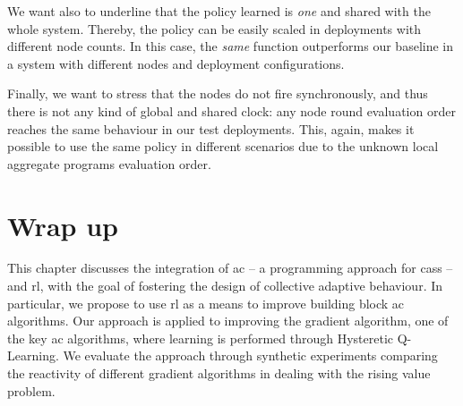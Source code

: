 We want also to underline that the policy learned is \emph{one} and shared with the whole system.  
%
Thereby, the policy can be easily scaled in deployments with different node counts. 
%
In this case, the \emph{same} function outperforms our baseline in a system with different nodes and deployment configurations. 
%

Finally, we want to stress that the nodes do not fire synchronously, and thus there is not any kind of global and shared clock: any node round evaluation order reaches the same behaviour in our test deployments. 
%
This, again, makes it possible to use the same policy in different scenarios due to the unknown local aggregate programs evaluation order.

\section{Wrap up}\label{coordination2022:s:conc}

This chapter discusses the integration of \acl{ac} -- a programming approach for \aclp{cas} -- and \acl{rl}, with the goal of fostering the design of collective adaptive behaviour.
% 
In particular, we propose to use \ac{rl} as a means to improve building block \ac{ac} algorithms. %
%
Our approach is applied to improving the gradient algorithm, one of the key \ac{ac} algorithms, where learning is performed through Hysteretic Q-Learning.
%
We evaluate the approach through synthetic experiments comparing the reactivity of different gradient algorithms in dealing with the rising value problem.

